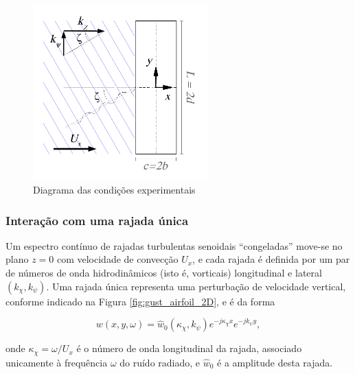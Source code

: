 \documentclass[a4paper, 11pt, twoside]{article}
\begin{document}
\begin{figure}[htbp]
	\centering
	\includegraphics[width=0.6\textwidth]{../figures/Oblique_Gust_aerofoil.pdf}
	\caption{Diagrama das condições experimentais}
	\label{fig:experimental_setup}
\end{figure}

\subsubsection{Interação com uma rajada única}

Um espectro contínuo de rajadas turbulentas senoidais ``congeladas'' move-se no plano $z=0$ com velocidade de convecção $U_x$, e cada rajada é definida por um par de números de onda hidrodinâmicos (isto é, vorticais) longitudinal e lateral $(k_\chi, k_\psi)$. Uma rajada única representa uma perturbação de velocidade vertical, conforme indicado na Figura \ref{fig:gust_airfoil_2D}, e é da forma

\begin{equation}
w(x, y, \omega) = \hat{w}_0(\kappa_\chi, k_\psi) e^{-j\kappa_\chi x} e^{-j k_\psi y },
\end{equation}

\noindent onde $\kappa_\chi = \omega/U_x$ é o número de onda longitudinal da rajada, associado unicamente à frequência $\omega$ do ruído radiado, e $\hat{w}_0$ é a amplitude desta rajada. %
\end{document}
